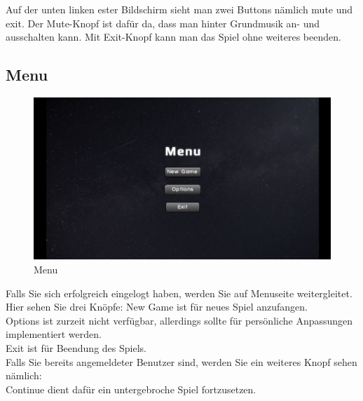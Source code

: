 \documentclass[fontsize=12pt,paper=a4,twoside]{scrartcl}
\begin{document}
Auf der unten linken ester Bildschirm sieht man zwei Buttons nämlich mute und exit. Der Mute-Knopf ist dafür da, dass man hinter Grundmusik an- und ausschalten kann. Mit Exit-Knopf kann man das Spiel ohne weiteres beenden.

\newpage

\subsection{Menu}

\begin{figure}[htp]
	\centering
	\includegraphics[width=1.00\linewidth]{pics/menuscreen.png}
	\caption{Menu}
	\label{fig1}

\end{figure}
Falls Sie sich erfolgreich eingelogt haben, werden Sie auf Menuseite weitergleitet. Hier sehen Sie drei Knöpfe:
New Game ist für neues Spiel anzufangen. \\
Options ist zurzeit nicht verfügbar, allerdings sollte für persönliche Anpassungen implementiert werden. \\
Exit ist für Beendung des Spiels.\\
Falls Sie bereits angemeldeter Benutzer sind, werden Sie ein weiteres Knopf sehen nämlich: \\
Continue dient dafür ein untergebroche Spiel fortzusetzen.
\newpage
\end{document}
